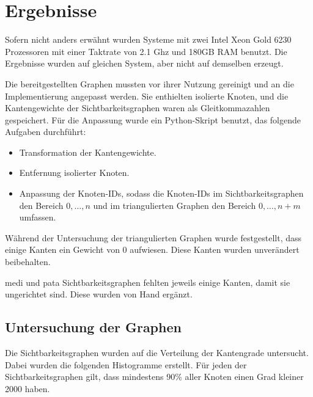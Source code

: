 \chapter{Ergebnisse}

Sofern nicht anders erwähnt wurden Systeme mit zwei Intel Xeon Gold 6230 Prozessoren mit einer Taktrate von 2.1 Ghz und 180GB RAM benutzt.
Die Ergebnisse wurden auf gleichen System, aber nicht auf demselben erzeugt.

Die bereitgestellten Graphen mussten vor ihrer Nutzung gereinigt und an die Implementierung angepasst werden.
Sie enthielten isolierte Knoten, und die Kantengewichte der Sichtbarkeitsgraphen waren als Gleitkommazahlen gespeichert.
Für die Anpassung wurde ein Python-Skript benutzt, das folgende Aufgaben durchführt:

\begin{itemize}
  \item
    Transformation der Kantengewichte.

  \item
    Entfernung isolierter Knoten.

  \item
    Anpassung der Knoten-IDs, sodass die Knoten-IDs im Sichtbarkeitsgraphen den Bereich $0, \dotsc, n$ und im triangulierten Graphen den Bereich $0, \dotsc, n + m$ umfassen.
\end{itemize}

Während der Untersuchung der triangulierten Graphen wurde festgestellt, dass einige Kanten ein Gewicht von 0 aufwiesen.
Diese Kanten wurden unverändert beibehalten.

medi und pata Sichtbarkeitsgraphen fehlten jeweils einige Kanten, damit sie ungerichtet sind.
Diese wurden von Hand ergänzt.

\section{Untersuchung der Graphen}

Die Sichtbarkeitsgraphen wurden auf die Verteilung der Kantengrade untersucht.
Dabei wurden die folgenden Histogramme erstellt.
Für jeden der Sichtbarkeitsgraphen gilt, dass mindestens 90\% aller Knoten einen Grad kleiner \num{2000} haben.

